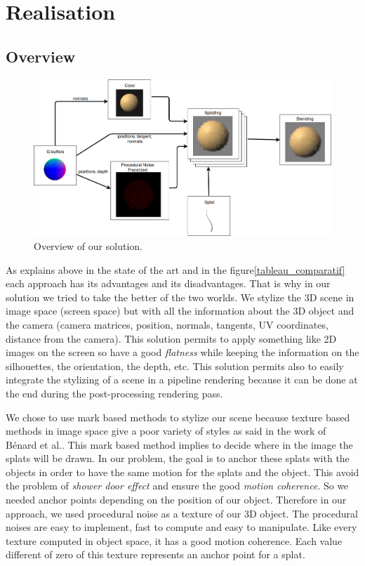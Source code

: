 \chapter{Realisation}


\section{Overview}

\begin{figure}
    \begin{center}
    \includegraphics[scale=0.4]{images/Overview2.png}
    \end{center}
    \caption{Overview of our solution.}
    \label{overview}
\end{figure}

As explains above in the state of the art and in the figure\ref{tableau_comparatif} each approach has its advantages and its disadvantages. That is why in our solution we tried to take the better of the two worlds. We stylize the 3D scene in image space (screen space) but with all the information about the 3D object and the camera (camera matrices, position, normals, tangents, UV coordinates, distance from the camera). This solution permits to apply something like 2D images on the screen so have a good \textit{flatness} while keeping the information on the silhouettes, the orientation, the depth, etc. This solution permits also to easily integrate the stylizing of a scene in a pipeline rendering because it can be done at the end during the post-processing rendering pass. \newline

We chose to use mark based methods to stylize our scene because texture based methods in image space give a poor variety of styles as said in the work of Bénard et al.\cite{benard_dynamic_2009}. This mark based method implies to decide where in the image the splats will be drawn. In our problem, the goal is to anchor these splats with the objects in order to have the same motion for the splats and the object. This avoid the problem of \textit{shower door effect} and ensure the good \textit{motion coherence}. So we needed anchor points depending on the position of our object. Therefore in our approach, we used procedural noise\cite{perlin_improving_2002} as a texture of our 3D object. The procedural noises are easy to implement, fast to compute and easy to manipulate. Like every texture computed in object space, it has a good motion coherence. Each value different of zero of this texture represents an anchor point for a splat.


